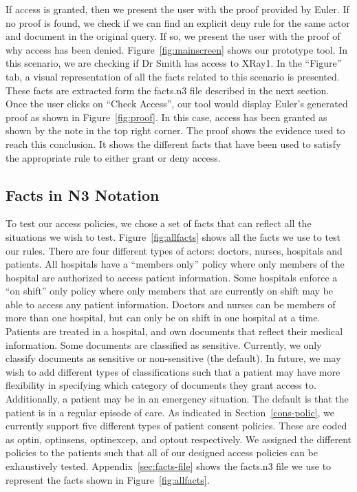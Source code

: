\documentclass[conference]{IEEEtran}
\begin{document}
If access is granted, then we present the user with the proof
provided by Euler. If no proof is found, we check if we can find an explicit deny rule for the same actor and document in the original query. If so, we present
the user with the proof of why access has been denied. Figure~\ref{fig:mainscreen} shows our prototype tool. In this scenario, we are checking if Dr Smith
has access to XRay1. In the ``Figure'' tab, a visual representation of all the facts related to this scenario is presented. These facts are extracted form
the facts.n3 file described in the next section. Once the user clicks on
``Check Access'', our tool would display Euler's generated proof as shown in Figure~\ref{fig:proof}. In this case, access has been granted as shown by the note
in
the top right corner. The proof shows the evidence used to reach this conclusion. It shows the different facts that have been used to satisfy the appropriate
rule to either grant or deny access.


\subsection{Facts in N3 Notation}

To test our access policies, we chose a set of facts that can reflect all the situations we wish to test. Figure~\ref{fig:allfacts} shows all the facts we use
to test our rules. There are four different types of actors: doctors, nurses, hospitals and patients. All hospitals have a ``members only'' policy where only
members of the hospital are authorized to access patient information. Some hospitals enforce a ``on shift'' only policy where only members that are currently on
shift may be able to access any patient information. Doctors and nurses can be members of more than one hospital, but can only be on shift in one hospital at a
time. Patients are treated in a hospital, and own documents that reflect their medical information. Some documents are classified as sensitive. Currently, we
only classify documents as sensitive or non-sensitive (the default). In future, we may wish to add different types of classifications such that a patient
may have more flexibility in specifying which category of documents they grant access to. Additionally, a patient may be in an emergency situation. The
default is that the patient is in a regular episode of care. As indicated in Section~\ref{cons-polic}, we currently support five different types of patient
consent policies. These are coded as optin, optinsens, optinexcep, and optout respectively. We assigned the different policies to the patients such that all of
our designed access policies can be exhaustively tested. 
Appendix~\ref{sec:facts-file} shows the facts.n3 file we use to represent the facts shown in Figure~\ref{fig:allfacts}.
\end{document}
